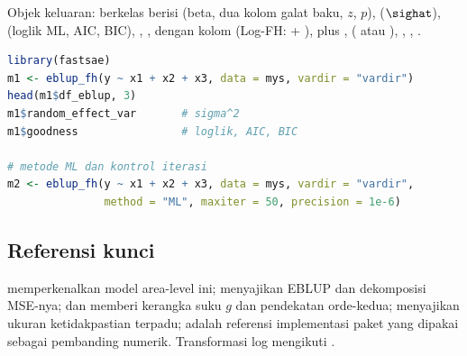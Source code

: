 Objek keluaran:  berkelas  berisi
 (beta, dua kolom galat baku, $z$, $p$), 
($\sighat$),  (loglik ML, AIC, BIC), ,
,  dengan kolom  (Log-FH: + ),
plus ,  ( atau ),
, , .

\begin{lstlisting}[language=R,caption={Contoh yang dapat dijalankan (dari \texttt{man/eblup\_fh.Rd}; data \texttt{mys} berisi 42 domain, 10 di antaranya tanpa sampel).}]
library(fastsae)
m1 <- eblup_fh(y ~ x1 + x2 + x3, data = mys, vardir = "vardir")
head(m1$df_eblup, 3)
m1$random_effect_var       # sigma^2
m1$goodness                # loglik, AIC, BIC

# metode ML dan kontrol iterasi
m2 <- eblup_fh(y ~ x1 + x2 + x3, data = mys, vardir = "vardir",
               method = "ML", maxiter = 50, precision = 1e-6)
\end{lstlisting}

\subsection{Referensi kunci}\label{sec:fh-ref}

\citet{fay1979small} memperkenalkan model area-level ini;
\citet{rao2015small} menyajikan EBLUP dan dekomposisi MSE-nya;
\citet{prasad1990estimation} dan \citet{kackar1984approximations} memberi
kerangka suku $g$ dan pendekatan orde-kedua; \citet{datta2000unified}
menyajikan ukuran ketidakpastian terpadu; \citet{molina2015sae} adalah
referensi implementasi paket  yang dipakai sebagai pembanding
numerik. Transformasi log mengikuti \citet{slud2006mean}.
